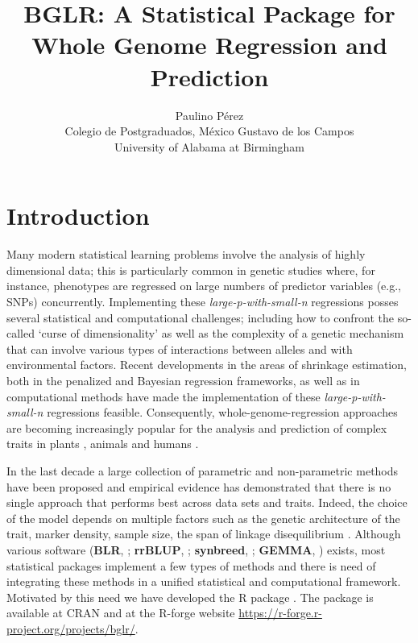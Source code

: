 \documentclass[article,shortnames,nojss]{jss}
\author{Paulino P\'erez \\Colegio de Postgraduados, M\'exico \And
        Gustavo de los Campos \\University of Alabama at Birmingham}
\title{BGLR: A Statistical Package for Whole Genome Regression and Prediction}
\begin{document}

\section{Introduction}
\label{sec:Intro}


Many modern statistical learning problems involve the analysis of highly dimensional data; 
this is particularly common in genetic studies where, for instance, phenotypes 
are regressed on large numbers of predictor variables (e.g., SNPs) concurrently. 
Implementing these \textit{large-p-with-small-n} regressions posses several 
statistical and computational challenges; including how to confront the so-called 
`curse of dimensionality' \citep{Bellman:1961} as well 
as the complexity of a genetic mechanism that can involve various types of 
interactions between alleles and with environmental factors. Recent developments 
in the areas of shrinkage estimation, both in the penalized and Bayesian 
regression frameworks, as well as in computational methods have 
made the implementation of these \textit{large-p-with-small-n} regressions feasible. 
Consequently, whole-genome-regression approaches \citep{Meuwissen:2001} are 
becoming increasingly popular for the analysis and prediction of complex 
traits in plants  \citep[e.g.][]{Crossa:2010}, animals 
\citep[e.g.][]{VanRaden:2009, Hayes:2009} 
and humans \citep[e.g.][]{Yang:2010,Makowsky:2011,Vazquez:2012, delosCampos:2013c}.

In the last decade a large collection of parametric and non-parametric 
methods have been proposed and empirical evidence has demonstrated that 
there is no single approach that performs best across data sets and 
traits. Indeed, the choice of the model depends on multiple factors 
such as the genetic architecture of the trait, marker density, sample 
size, the span of linkage disequilibrium
\citep[e.g.,][]{delosCampos:2013b}. Although various 
software (\textbf{BLR}, \citealt{Perez:2010}; \textbf{rrBLUP}, 
\citealt{Endelman:2011};
\textbf{synbreed}, \citealt{Wimmer:2012}; \textbf{GEMMA}, \citealt{Zhou:2012}) 
exists, most statistical packages implement a few 
types of methods and there is need of integrating these methods in a 
unified statistical and computational framework. Motivated by this need we 
have developed the R \citep{Rsoft} package 
 \citep{delosCampos:2013a}. The package is available 
at CRAN and at the R-forge website 
\url{https://r-forge.r-project.org/projects/bglr/}. 
\end{document}
